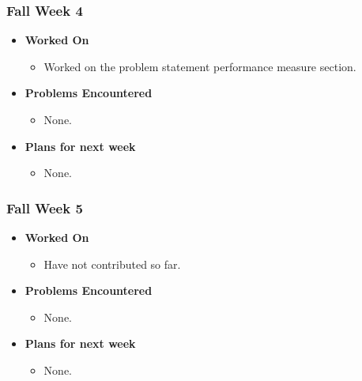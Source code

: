 \documentclass[compsoc,draftclsnofoot,onecolumn,10pt]{IEEEtran}
\begin{document}
\subsubsection{Fall Week 4}
\begin{itemize}
    \item {\textbf{Worked On}}
    \begin{itemize}
      \item Worked on the problem statement performance measure section.
    \end{itemize}

    \item {\textbf{Problems Encountered}}
    \begin{itemize}
      \item None.
    \end{itemize}

    \item{\textbf{Plans for next week}}
    \begin{itemize}
      \item None.
    \end{itemize}

\end{itemize}

\subsubsection{Fall Week 5}
\begin{itemize}
    \item {\textbf{Worked On}}
    \begin{itemize}
      \item Have not contributed so far.
    \end{itemize}

    \item {\textbf{Problems Encountered}}
    \begin{itemize}
      \item None.
    \end{itemize}

    \item{\textbf{Plans for next week}}
    \begin{itemize}
      \item None.
    \end{itemize}

\end{itemize}
\end{document}
